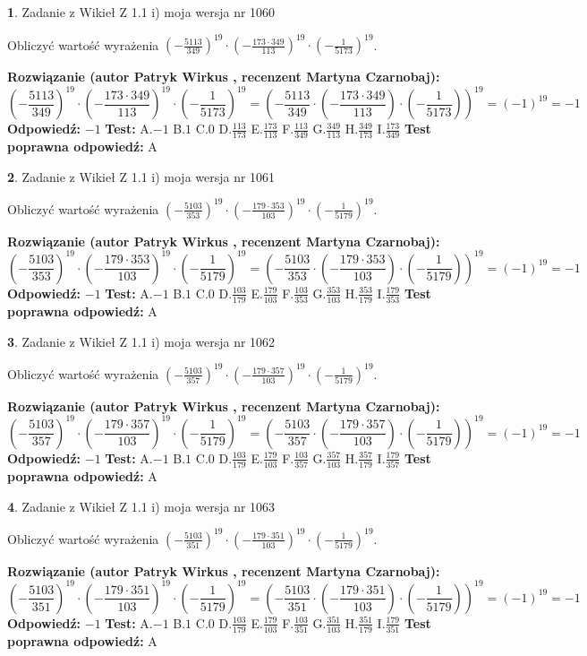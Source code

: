 \documentclass[12pt, a4paper]{article}
\theoremstyle{definition} %
\newtheorem{zad}{}
\newcommand{\zadStart}[1]{\begin{zad}#1\newline}
\newcommand{\zadStop}{\end{zad}}
\newcommand{\rozwStart}[2]{\noindent \textbf{Rozwiązanie (autor #1 , recenzent #2): }\newline}
\newcommand{\rozwStop}{\newline}
\newcommand{\odpStart}{\noindent \textbf{Odpowiedź:}\newline}
\newcommand{\odpStop}{\newline}
\newcommand{\testStart}{\noindent \textbf{Test:}\newline}
\newcommand{\testStop}{\newline}
\newcommand{\kluczStart}{\noindent \textbf{Test poprawna odpowiedź:}\newline}
\newcommand{\kluczStop}{\newline}
\begin{document}
\zadStart{Zadanie z Wikieł Z 1.1 i) moja wersja nr 1060}

Obliczyć wartość wyrażenia $(-\frac{5113}{349})^{19} \cdot (-\frac{173 \cdot 349}{113})^{19} \cdot (-\frac{1}{5173})^{19}$.
\zadStop
\rozwStart{Patryk Wirkus}{Martyna Czarnobaj}
$$(-\frac{5113}{349})^{19} \cdot (-\frac{173 \cdot 349}{113})^{19} \cdot (-\frac{1}{5173})^{19} = (-\frac{5113}{349} \cdot (-\frac{173 \cdot 349}{113}) \cdot (-\frac{1}{5173}))^{19} = (-1)^{19} = -1$$
\rozwStop
\odpStart
$-1$
\odpStop
\testStart
A.$-1$ B.$1$ C.$0$ D.$\frac{113}{173}$ E.$\frac{173}{113}$
F.$\frac{113}{349}$ G.$\frac{349}{113}$
H.$\frac{349}{173}$
I.$\frac{173}{349}$
\testStop
\kluczStart
A
\kluczStop



\zadStart{Zadanie z Wikieł Z 1.1 i) moja wersja nr 1061}

Obliczyć wartość wyrażenia $(-\frac{5103}{353})^{19} \cdot (-\frac{179 \cdot 353}{103})^{19} \cdot (-\frac{1}{5179})^{19}$.
\zadStop
\rozwStart{Patryk Wirkus}{Martyna Czarnobaj}
$$(-\frac{5103}{353})^{19} \cdot (-\frac{179 \cdot 353}{103})^{19} \cdot (-\frac{1}{5179})^{19} = (-\frac{5103}{353} \cdot (-\frac{179 \cdot 353}{103}) \cdot (-\frac{1}{5179}))^{19} = (-1)^{19} = -1$$
\rozwStop
\odpStart
$-1$
\odpStop
\testStart
A.$-1$ B.$1$ C.$0$ D.$\frac{103}{179}$ E.$\frac{179}{103}$
F.$\frac{103}{353}$ G.$\frac{353}{103}$
H.$\frac{353}{179}$
I.$\frac{179}{353}$
\testStop
\kluczStart
A
\kluczStop



\zadStart{Zadanie z Wikieł Z 1.1 i) moja wersja nr 1062}

Obliczyć wartość wyrażenia $(-\frac{5103}{357})^{19} \cdot (-\frac{179 \cdot 357}{103})^{19} \cdot (-\frac{1}{5179})^{19}$.
\zadStop
\rozwStart{Patryk Wirkus}{Martyna Czarnobaj}
$$(-\frac{5103}{357})^{19} \cdot (-\frac{179 \cdot 357}{103})^{19} \cdot (-\frac{1}{5179})^{19} = (-\frac{5103}{357} \cdot (-\frac{179 \cdot 357}{103}) \cdot (-\frac{1}{5179}))^{19} = (-1)^{19} = -1$$
\rozwStop
\odpStart
$-1$
\odpStop
\testStart
A.$-1$ B.$1$ C.$0$ D.$\frac{103}{179}$ E.$\frac{179}{103}$
F.$\frac{103}{357}$ G.$\frac{357}{103}$
H.$\frac{357}{179}$
I.$\frac{179}{357}$
\testStop
\kluczStart
A
\kluczStop



\zadStart{Zadanie z Wikieł Z 1.1 i) moja wersja nr 1063}

Obliczyć wartość wyrażenia $(-\frac{5103}{351})^{19} \cdot (-\frac{179 \cdot 351}{103})^{19} \cdot (-\frac{1}{5179})^{19}$.
\zadStop
\rozwStart{Patryk Wirkus}{Martyna Czarnobaj}
$$(-\frac{5103}{351})^{19} \cdot (-\frac{179 \cdot 351}{103})^{19} \cdot (-\frac{1}{5179})^{19} = (-\frac{5103}{351} \cdot (-\frac{179 \cdot 351}{103}) \cdot (-\frac{1}{5179}))^{19} = (-1)^{19} = -1$$
\rozwStop
\odpStart
$-1$
\odpStop
\testStart
A.$-1$ B.$1$ C.$0$ D.$\frac{103}{179}$ E.$\frac{179}{103}$
F.$\frac{103}{351}$ G.$\frac{351}{103}$
H.$\frac{351}{179}$
I.$\frac{179}{351}$
\testStop
\kluczStart
A
\kluczStop
\end{document}
